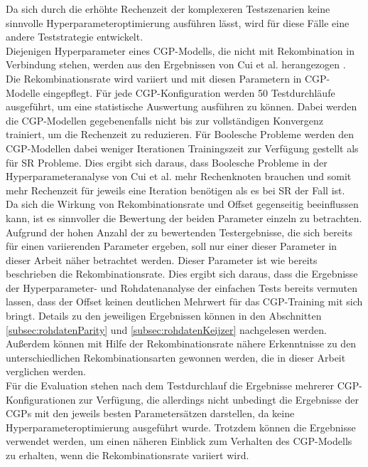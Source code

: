Da sich durch die erhöhte Rechenzeit der komplexeren Testszenarien keine sinnvolle Hyperparameteroptimierung ausführen lässt, wird für diese Fälle eine andere Teststrategie entwickelt.\\
Diejenigen Hyperparameter eines CGP-Modells, die nicht mit Rekombination in Verbindung stehen, werden aus den Ergebnissen von Cui et al. herangezogen \cite{cui_results}.
Die Rekombinationsrate wird variiert und mit diesen Parametern in CGP-Modelle eingepflegt.
Für jede CGP-Konfiguration werden 50 Testdurchläufe ausgeführt, um eine statistische Auswertung ausführen zu können.
Dabei werden die CGP-Modellen gegebenenfalls nicht bis zur vollständigen Konvergenz trainiert, um die Rechenzeit zu reduzieren. 
Für Boolesche Probleme werden den CGP-Modellen dabei weniger Iterationen Trainingszeit zur Verfügung gestellt als für SR Probleme.
Dies ergibt sich daraus, dass Boolesche Probleme in der Hyperparameteranalyse von Cui et al. mehr Rechenknoten brauchen und somit mehr Rechenzeit für jeweils eine Iteration benötigen als es bei SR der Fall ist. \cite{cui_results}\\
Da sich die Wirkung von Rekombinationsrate und Offset gegenseitig beeinflussen kann, ist es sinnvoller die Bewertung der beiden Parameter einzeln zu betrachten.
Aufgrund der hohen Anzahl der zu bewertenden Testergebnisse, die sich bereits für einen variierenden Parameter ergeben, soll nur einer dieser Parameter in dieser Arbeit näher betrachtet werden.
Dieser Parameter ist wie bereits beschrieben die Rekombinationsrate.
Dies ergibt sich daraus, dass die Ergebnisse der Hyperparameter- und Rohdatenanalyse der einfachen Tests bereits vermuten lassen, dass der Offset keinen deutlichen Mehrwert für das CGP-Training mit sich bringt.
Details zu den jeweiligen Ergebnissen können in den Abschnitten \ref{subsec:rohdatenParity} und \ref{subsec:rohdatenKeijzer} nachgelesen werden.
Außerdem können mit Hilfe der Rekombinationsrate nähere Erkenntnisse zu den unterschiedlichen Rekombinationsarten gewonnen werden, die in dieser Arbeit verglichen werden.\\
Für die Evaluation stehen nach dem Testdurchlauf die Ergebnisse mehrerer CGP-Kon\-fi\-gu\-ra\-tio\-nen zur Verfügung, die allerdings nicht unbedingt die Ergebnisse der CGPs mit den jeweils besten Parametersätzen darstellen, da keine Hyperparameteroptimierung ausgeführt wurde.
Trotzdem können die Ergebnisse verwendet werden, um einen näheren Einblick zum Verhalten des CGP-Modells zu erhalten, wenn die Rekombinationsrate variiert wird.


